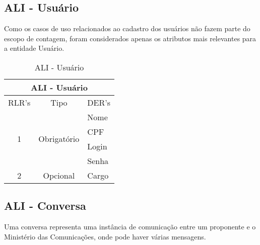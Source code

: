   \subsection{ALI - Usuário}
      
      Como os casos de uso relacionados ao cadastro dos usuários não fazem parte do escopo de contagem, 
      foram considerados apenas os atributos mais relevantes para a entidade Usuário.
      
      \begin{table}[!h]
      \centering
      \caption{ALI - Usuário}
      \label{ali_usuario}
      \begin{tabular}{|c|c|l|}
      \hline
      \multicolumn{3}{|c|}{ALI - Usuário}                                                     \\ \hline
      \multicolumn{1}{|l|}{RLR's} & Tipo                         & \multicolumn{1}{c|}{DER's} \\ \hline
      \multirow{4}{*}{1}          & \multirow{4}{*}{Obrigatório} & Nome                       \\ \cline{3-3} 
				  &                              & CPF                        \\ \cline{3-3} 
				  &                              & Login                      \\ \cline{3-3} 
				  &                              & Senha                      \\ \hline
      2                           & Opcional                     & Cargo                      \\ \hline
      \end{tabular}
      \end{table}
      
  \subsection{ALI - Conversa}
    
      Uma conversa representa uma instância de comunicação entre um proponente e o Ministério das Comunicações,
      onde pode haver várias mensagens.
    
